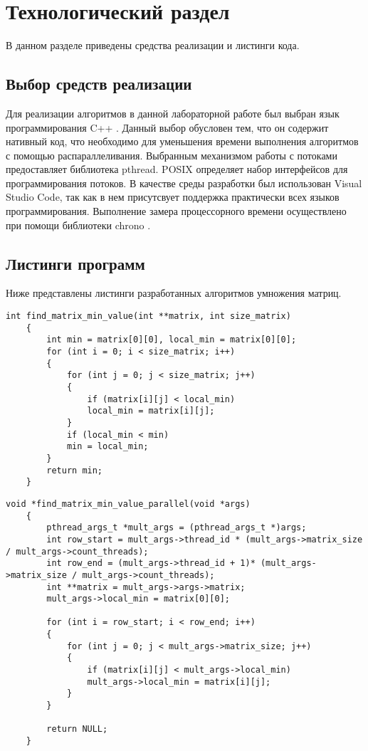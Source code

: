 \chapter{Технологический раздел}
В данном разделе приведены средства реализации и листинги кода.

\section{Выбор средств реализации}
Для реализации алгоритмов в данной лабораторной работе был выбран язык программирования C++ \cite{c++}. Данный выбор обусловен тем, что он содержит нативный код, что необходимо для уменьшения времени выполнения алгоритмов с помощью распараллеливания. Выбранным механизмом работы с потоками предоставляет библиотека pthread\cite{pthreads}. POSIX определяет набор интерфейсов для программирования потоков. В качестве среды разработки был использован Visual Studio Code\cite{vs}, так как в нем присутсвует поддержка практически всех языков программирования. Выполнение замера процессорного времени осуществлено при помощи библиотеки chrono \cite{chrono}.

\section{Листинги программ}
Ниже представлены листинги разработанных алгоритмов умножения матриц.
\newpage
\begin{lstlisting}[label = ordinary_min, caption=Программный код алгоритма нахождения минимума в матрице (последовательная реализация).]
	int find_matrix_min_value(int **matrix, int size_matrix)
	{
		int min = matrix[0][0], local_min = matrix[0][0];
		for (int i = 0; i < size_matrix; i++)
		{
			for (int j = 0; j < size_matrix; j++)
			{
				if (matrix[i][j] < local_min)
				local_min = matrix[i][j];
			}
			if (local_min < min)
			min = local_min;
		}
		return min;
	}
\end{lstlisting}

\begin{lstlisting}[label=vinograd_mult,caption=Программный код алгоритма нахождения минимума в матрице (параллельная реализация).]
	void *find_matrix_min_value_parallel(void *args)
	{
		pthread_args_t *mult_args = (pthread_args_t *)args;
		int row_start = mult_args->thread_id * (mult_args->matrix_size / mult_args->count_threads);
		int row_end = (mult_args->thread_id + 1)* (mult_args->matrix_size / mult_args->count_threads);
		int **matrix = mult_args->args->matrix;
		mult_args->local_min = matrix[0][0];
		
		for (int i = row_start; i < row_end; i++)
		{
			for (int j = 0; j < mult_args->matrix_size; j++)
			{
				if (matrix[i][j] < mult_args->local_min)
				mult_args->local_min = matrix[i][j];
			}
		}
		
		return NULL;
	}
\end{lstlisting}

